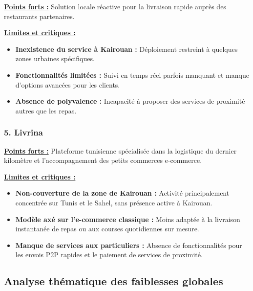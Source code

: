 \documentclass[12pt,fleqn,a4paper]{report}
\begin{document}
\begin{justify}
\noindent \textbf{\underline{Points forts :}}
Solution locale réactive pour la livraison rapide auprès des restaurants partenaires.

\vspace{0.2cm}
\noindent \textbf{\underline{Limites et critiques :}}
\begin{itemize}
    \item \textbf{Inexistence du service à Kairouan :} Déploiement restreint à quelques zones urbaines spécifiques.
    \item \textbf{Fonctionnalités limitées :} Suivi en temps réel parfois manquant et manque d'options avancées pour les clients.
    \item \textbf{Absence de polyvalence :} Incapacité à proposer des services de proximité autres que les repas.
\end{itemize}

\vspace{0.5cm}

\subsubsection*{\Large \textbf{5. Livrina}}
\vspace{0.2cm}

\noindent \textbf{\underline{Points forts :}}
Plateforme tunisienne spécialisée dans la logistique du dernier kilomètre et l'accompagnement des petits commerces e-commerce.

\vspace{0.2cm}
\noindent \textbf{\underline{Limites et critiques :}}
\begin{itemize}
    \item \textbf{Non-couverture de la zone de Kairouan :} Activité principalement concentrée sur Tunis et le Sahel, sans présence active à Kairouan.
    \item \textbf{Modèle axé sur l'e-commerce classique :} Moins adaptée à la livraison instantanée de repas ou aux courses quotidiennes sur mesure.
    \item \textbf{Manque de services aux particuliers :} Absence de fonctionnalités pour les envois P2P rapides et le paiement de services de proximité.
\end{itemize}

\vspace{0.5cm}

\subsection{Analyse thématique des faiblesses globales}


\end{justify}
\end{document}

